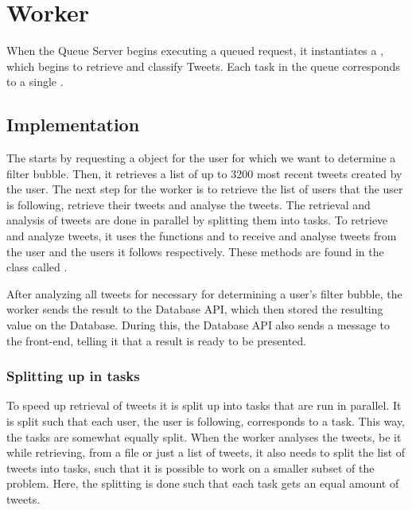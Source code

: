 \chapter{Worker}\label{workerLabel}
When the Queue Server begins executing a queued request, it instantiates a
, which begins to retrieve and classify Tweets. Each task in the
queue corresponds to a single . \nl


% 

\section{Implementation}\label{sec:workerImpl}
The  starts by requesting a  object for the user for
which we want to determine a filter bubble. Then, it retrieves a list of up to
3200 most recent tweets created by the user. The next step for the worker is to
retrieve the list of users that the user is following, retrieve their tweets and
analyse the tweets. The retrieval and analysis of tweets are done in parallel by
splitting them into tasks. To retrieve and analyze tweets, it uses the functions
 and 
to receive and analyse tweets from the user and the users it follows
respectively. These methods are found in the class called
.\nl

After analyzing all tweets for necessary for determining a user's filter bubble,
the worker sends the result to the Database \ac{API}, which then stored the
resulting value on the Database. During this, the Database \ac{API} also sends a
message to the front-end, telling it that a result is ready to be presented.

\subsection{Splitting up in tasks}\label{sec:taskSplit}
To speed up retrieval of tweets it is split up into tasks that are
run in parallel. It is split such that each user, the user is following,
corresponds to a task. This way, the tasks are somewhat equally split.
When the worker analyses the tweets, be it while retrieving, from a file or just
a list of tweets, it also needs to split the list of tweets into tasks, such
that it is possible to work on a smaller subset of the problem. Here, the
splitting is done such that each task gets an equal amount of tweets.

